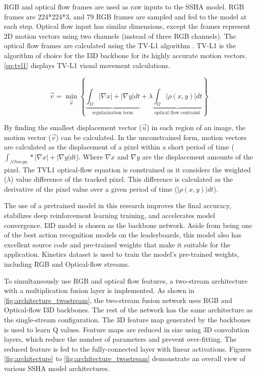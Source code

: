 \documentclass[review]{elsarticle}
\begin{document}
RGB and optical flow frames are used as raw inputs to the SSHA model. RGB frames are 224*224*3, and 79 RGB frames are sampled and fed to the model at each step. Optical flow input has similar dimensions, except the frames represent 2D motion vectors using two channels (instead of three RGB channels). The optical flow frames are calculated using the TV-L1 algorithm \citep{carreira2017quo}. TV-L1 is the algorithm of choice for the I3D backbone \citep{carreira2017quo} for its highly accurate motion vectors. \autoref{eq:tvl1} displays TV-L1 visual movement calculations.

\begin{equation}
\label{eq:tvl1}
\vec{v} = \displaystyle \min_{ \vec{u} } \left\{ \underbrace{\int_{\Omega}^{} \left| \nabla x \right| + \left| \nabla y \right|dt}_{\text{regularization term}} + \lambda \underbrace{\int_{\Omega}^{} \left|  \rho \left( x , y \right) \right|dt}_{\text{optical flow contraint}}  \right\}
\end{equation}

{By finding the smallest displacement vector ($\vec{u}$) in each region of an image, the motion vector ($\vec{v}$) can be calculated. In the unconstrained form, motion vectors are calculated as the displacement of a pixel within a short period of time ($\int_{/Omega}*{} \left| \nabla x \right| + \left| \nabla y \right| dt$). Where $\nabla x$ and $\nabla y$ are the displacement amounts of the pixel. The TVL1 optical-flow equation is constrained as it considers the weighted ($\lambda$) value difference of the tracked pixel. This difference is calculated as the derivative of the pixel value over a given period of time ($\left|  \rho \left( x , y \right) \right|dt$).}

The use of a pretrained model in this research improves the final accuracy, stabilizes deep reinforcement learning training, and accelerates model convergence. I3D model \citep{carreira2017quo} is chosen as the backbone network. Aside from being one of the best action recognition models on the leaderboards, this model also has excellent source code and pre-trained weights that make it suitable for the application. Kinetics dataset \citep{smaira2020short} is used to train the model's pre-trained weights, including RGB and Optical-flow streams.

To simultaneously use RGB and optical flow features, a two-stream architecture \citep{feichtenhofer2016convolutional} with a multiplication fusion layer is implemented. As shown in \autoref{fig:architecture_twostream}, the two-stream fusion network uses RGB and Optical-flow I3D backbones. The rest of the network has the same architecture as the single-stream configuration. The 3D feature map generated by the backbones is used to learn Q values. Feature maps are reduced in size using 3D convolution layers, which reduce the number of parameters and prevent over-fitting. The reduced feature is fed to the fully-connected layer with linear activations. Figures \ref{fig:architecture} to \ref{fig:architecture_twostream} demonstrate an overall view of various SSHA model architectures.
\end{document}
